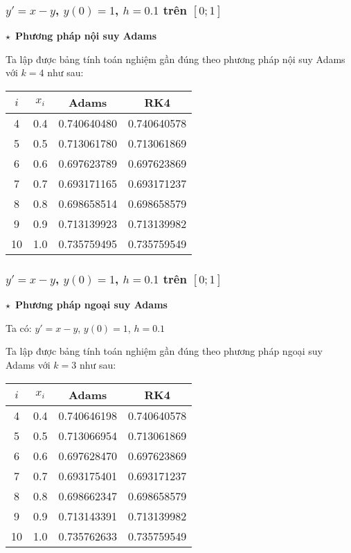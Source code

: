 \begin{frame}
	\frametitle{$y'=x-y$, $y(0)=1$, $h=0.1$ trên $[0;1]$}
	$\star$~\textbf{Phương pháp nội suy Adams}\par
	Ta lập được bảng tính toán nghiệm gần đúng theo phương pháp nội suy Adams với $k=4$ như sau:
	\begin{table}\begin{tabular}{|c|c|c|c|}\hline
		$i$&$x_i$&Adams      &RK4\\ \hline
		4  &0.4 &0.740640480 &0.740640578\\ \hline
		5  &0.5 &0.713061780 &0.713061869\\ \hline
		6  &0.6 &0.697623789 &0.697623869\\ \hline
		7  &0.7 &0.693171165 &0.693171237\\ \hline
		8  &0.8 &0.698658514 &0.698658579\\ \hline
		9  &0.9 &0.713139923 &0.713139982\\ \hline
		10 &1.0 &0.735759495 &0.735759549\\ \hline
	\end{tabular}\end{table}
\end{frame}

\begin{frame}
	\frametitle{$y'=x-y$, $y(0)=1$, $h=0.1$ trên $[0;1]$}
	$\star$~\textbf{Phương pháp ngoại suy Adams}\par
	Ta có: $y'=x-y$, $y(0)=1$, $h=0.1$\par
	Ta lập được bảng tính toán nghiệm gần đúng theo phương pháp ngoại suy Adams với $k=3$ như sau:
	\begin{table}\begin{tabular}{|c|c|c|c|}\hline
	$i$&$x_i$&Adams&RK4\\ \hline
	4  &0.4 &0.740646198 &0.740640578\\ \hline
	5  &0.5 &0.713066954 &0.713061869\\ \hline
	6  &0.6 &0.697628470 &0.697623869\\ \hline
	7  &0.7 &0.693175401 &0.693171237\\ \hline
	8  &0.8 &0.698662347 &0.698658579\\ \hline
	9  &0.9 &0.713143391 &0.713139982\\ \hline
	10 &1.0 &0.735762633 &0.735759549\\ \hline
	\end{tabular}\end{table}
\end{frame}